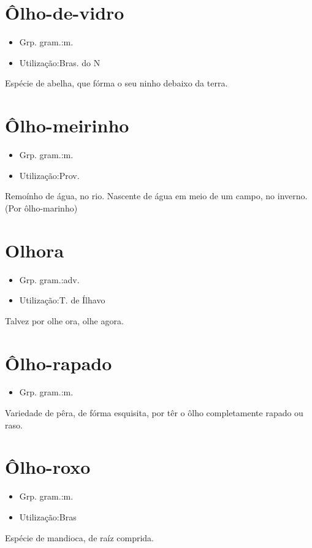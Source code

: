 \section{Ôlho-de-vidro}
\begin{itemize}
\item {Grp. gram.:m.}
\end{itemize}
\begin{itemize}
\item {Utilização:Bras. do N}
\end{itemize}
Espécie de abelha, que fórma o seu ninho debaixo da terra.
\section{Ôlho-meirinho}
\begin{itemize}
\item {Grp. gram.:m.}
\end{itemize}
\begin{itemize}
\item {Utilização:Prov.}
\end{itemize}
Remoínho de água, no rio.
Nascente de água em meio de um campo, no inverno.
(Por \textunderscore ôlho-marinho\textunderscore )
\section{Olhora}
\begin{itemize}
\item {Grp. gram.:adv.}
\end{itemize}
\begin{itemize}
\item {Utilização:T. de Ílhavo}
\end{itemize}
Talvez por \textunderscore olhe ora\textunderscore , olhe agora.
\section{Ôlho-rapado}
\begin{itemize}
\item {Grp. gram.:m.}
\end{itemize}
Variedade de pêra, de fórma esquisita, por têr o ôlho completamente rapado ou raso.
\section{Ôlho-roxo}
\begin{itemize}
\item {Grp. gram.:m.}
\end{itemize}
\begin{itemize}
\item {Utilização:Bras}
\end{itemize}
Espécie de mandioca, de raíz comprida.
